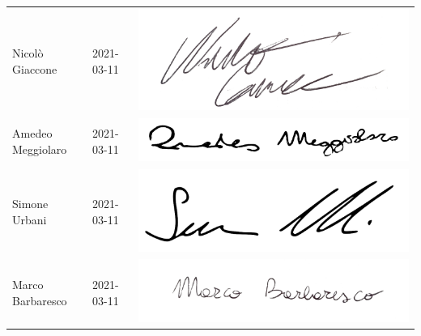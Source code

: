 \begin{center}
\begin{table}[h!]
\begin{tabular}{p{150px} p{110px} p{110px}}
                    Nicolò Giaccone & 2021-03-11 & \includegraphics[scale=0.04]{../../../Images/firme/firmaGiacconeNicolo.png}\\
                    Amedeo Meggiolaro & 2021-03-11 & \includegraphics[scale=0.05]{../../../Images/firme/firmaAmedeoMeggiolaro.png} \\
                    Simone Urbani & 2021-03-11 & \includegraphics[scale=0.05]{../../../Images/firme/firmaSimoneUrbani.png} \\
                    Marco Barbaresco & 2021-03-11 & \includegraphics[scale=0.07]{../../../Images/firme/firmaMarcoBarbaresco.png} \\
                \end{tabular}
            \end{table}
        \end{center}
